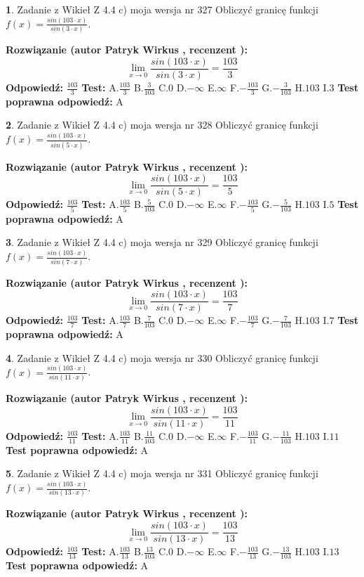 \documentclass[12pt, a4paper]{article}
\theoremstyle{definition} %
\newtheorem{zad}{}
\newcommand{\zadStart}[1]{\begin{zad}#1\newline}
\newcommand{\zadStop}{\end{zad}}
\newcommand{\rozwStart}[2]{\noindent \textbf{Rozwiązanie (autor #1 , recenzent #2): }\newline}
\newcommand{\rozwStop}{\newline}
\newcommand{\odpStart}{\noindent \textbf{Odpowiedź:}\newline}
\newcommand{\odpStop}{\newline}
\newcommand{\testStart}{\noindent \textbf{Test:}\newline}
\newcommand{\testStop}{\newline}
\newcommand{\kluczStart}{\noindent \textbf{Test poprawna odpowiedź:}\newline}
\newcommand{\kluczStop}{\newline}
\begin{document}
\zadStart{Zadanie z Wikieł Z 4.4 c) moja wersja nr 327}
Obliczyć granicę funkcji $f(x)=\frac{sin(103\cdot x)}{sin(3\cdot x)}$.
\zadStop
\rozwStart{Patryk Wirkus}{}
$$\lim\limits_{x\to 0}\frac{sin(103\cdot x)}{sin(3\cdot x)}=
\frac{103}{3}$$
\rozwStop
\odpStart
$\frac{103}{3}$
\odpStop
\testStart
A.$\frac{103}{3}$
B.$\frac{3}{103}$
C.$0$
D.$-\infty$
E.$\infty$
F.$-\frac{103}{3}$
G.$-\frac{3}{103}$
H.$103$
I.$3$
\testStop
\kluczStart
A
\kluczStop



\zadStart{Zadanie z Wikieł Z 4.4 c) moja wersja nr 328}
Obliczyć granicę funkcji $f(x)=\frac{sin(103\cdot x)}{sin(5\cdot x)}$.
\zadStop
\rozwStart{Patryk Wirkus}{}
$$\lim\limits_{x\to 0}\frac{sin(103\cdot x)}{sin(5\cdot x)}=
\frac{103}{5}$$
\rozwStop
\odpStart
$\frac{103}{5}$
\odpStop
\testStart
A.$\frac{103}{5}$
B.$\frac{5}{103}$
C.$0$
D.$-\infty$
E.$\infty$
F.$-\frac{103}{5}$
G.$-\frac{5}{103}$
H.$103$
I.$5$
\testStop
\kluczStart
A
\kluczStop



\zadStart{Zadanie z Wikieł Z 4.4 c) moja wersja nr 329}
Obliczyć granicę funkcji $f(x)=\frac{sin(103\cdot x)}{sin(7\cdot x)}$.
\zadStop
\rozwStart{Patryk Wirkus}{}
$$\lim\limits_{x\to 0}\frac{sin(103\cdot x)}{sin(7\cdot x)}=
\frac{103}{7}$$
\rozwStop
\odpStart
$\frac{103}{7}$
\odpStop
\testStart
A.$\frac{103}{7}$
B.$\frac{7}{103}$
C.$0$
D.$-\infty$
E.$\infty$
F.$-\frac{103}{7}$
G.$-\frac{7}{103}$
H.$103$
I.$7$
\testStop
\kluczStart
A
\kluczStop



\zadStart{Zadanie z Wikieł Z 4.4 c) moja wersja nr 330}
Obliczyć granicę funkcji $f(x)=\frac{sin(103\cdot x)}{sin(11\cdot x)}$.
\zadStop
\rozwStart{Patryk Wirkus}{}
$$\lim\limits_{x\to 0}\frac{sin(103\cdot x)}{sin(11\cdot x)}=
\frac{103}{11}$$
\rozwStop
\odpStart
$\frac{103}{11}$
\odpStop
\testStart
A.$\frac{103}{11}$
B.$\frac{11}{103}$
C.$0$
D.$-\infty$
E.$\infty$
F.$-\frac{103}{11}$
G.$-\frac{11}{103}$
H.$103$
I.$11$
\testStop
\kluczStart
A
\kluczStop



\zadStart{Zadanie z Wikieł Z 4.4 c) moja wersja nr 331}
Obliczyć granicę funkcji $f(x)=\frac{sin(103\cdot x)}{sin(13\cdot x)}$.
\zadStop
\rozwStart{Patryk Wirkus}{}
$$\lim\limits_{x\to 0}\frac{sin(103\cdot x)}{sin(13\cdot x)}=
\frac{103}{13}$$
\rozwStop
\odpStart
$\frac{103}{13}$
\odpStop
\testStart
A.$\frac{103}{13}$
B.$\frac{13}{103}$
C.$0$
D.$-\infty$
E.$\infty$
F.$-\frac{103}{13}$
G.$-\frac{13}{103}$
H.$103$
I.$13$
\testStop
\kluczStart
A
\kluczStop
\end{document}
